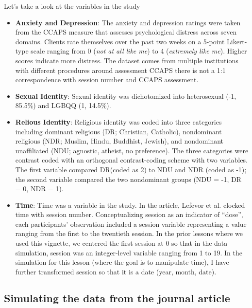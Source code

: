 \documentclass[
  11pt,
]{book}
\begin{document}
Let's take a look at the variables in the study

\begin{itemize}
\item
  \textbf{Anxiety and Depression}: The anxiety and depression ratings were taken from the CCAPS measure \citep{locke_development_2012} that assesses psychological distress across seven domains. Clients rate themselves over the past two weeks on a 5-point Likert-type scale ranging from 0 (\emph{not at all like me}) to 4 (\emph{extremely like me}). Higher scores indicate more distress. The dataset comes from multiple institutions with different procedures around assessment CCAPS there is not a 1:1 correspondence with session number and CCAPS assessment.
\item
  \textbf{Sexual Identity}: Sexual identity was dichotomized into heterosexual (-1, 85.5\%) and LGBQQ (1, 14.5\%).
\item
  \textbf{Relious Identity}: Religious identity was coded into three categories including dominant religious (DR; Christian, Catholic), nondominant religious (NDR; Muslim, Hindu, Buddhist, Jewish), and nondominant unaffiliated (NDU; agnostic, atheist, no preference). The three categories were contrast coded with an orthogonal contrast-coding scheme with two variables. The first variable compared DR(coded as 2) to NDU and NDR (coded as -1); the second variable compared the two nondominant groups (NDU = -1, DR = 0, NDR = 1).
\item
  \textbf{Time}: Time was a variable in the study. In the article, Lefevor et al. \citeyearpar{lefevor_religious_2017}clocked time with session number. Conceptualizing session as an indicator of ``dose'', each participants' observation included a session variable representing a value ranging from the first to the twentieth session. In the prior lessons where we used this vignette, we centered the first session at 0 so that in the data simulation, session was an integer-level variable ranging from 1 to 19. In the simulation for this lesson (where the goal is to manipulate time), I have further transformed session so that it is a date (year, month, date).
\end{itemize}

\hypertarget{simulating-the-data-from-the-journal-article-3}{%
\subsection{Simulating the data from the journal article}\label{simulating-the-data-from-the-journal-article-3}}
\end{document}
